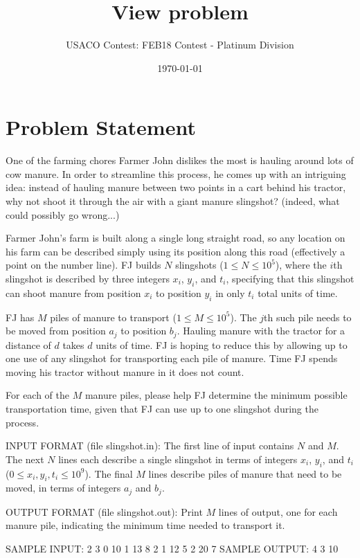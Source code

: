 \documentclass[12pt]{article}
\title{View problem}
\author{USACO Contest: FEB18 Contest - Platinum Division}
\date{\today}
\begin{document}
\maketitle

\section*{Problem Statement}

One of the farming chores Farmer John dislikes the most is hauling around lots
of cow manure.  In order to streamline this process, he comes up with an
intriguing idea: instead of hauling manure between two points in a cart behind
his tractor, why not shoot it through the air with a giant manure slingshot? 
(indeed, what could possibly go wrong...)

Farmer John's farm is built along a single long straight road, so any location
on his farm can be described simply using its position along this road
(effectively a point on the number line).  FJ builds $N$ slingshots
($1 \leq N \leq 10^5$), where the $i$th slingshot is described by three integers
$x_i$, $y_i$, and $t_i$, specifying that this slingshot can shoot manure from
position $x_i$ to position $y_i$ in only $t_i$ total units of time.  

FJ has $M$ piles of manure to transport ($1 \leq M \leq 10^5$).  The $j$th such
pile needs to be moved from position $a_j$ to position $b_j$.  Hauling manure
with the tractor for a distance of $d$ takes $d$ units of time.  FJ is hoping to
reduce this by allowing up to one use of any slingshot for transporting each
pile of manure.  Time FJ spends moving his tractor without manure in it does
not count.

For each of the $M$ manure piles, please help FJ determine the minimum possible
transportation time, given that FJ can use up to one slingshot during the
process.

INPUT FORMAT (file slingshot.in):
The first line of input contains $N$ and $M$.  The next $N$ lines each describe
a single slingshot in terms of integers $x_i$, $y_i$, and $t_i$
($0 \leq x_i, y_i, t_i \leq 10^9$). The final $M$ lines describe piles of manure
that need to be moved, in terms of integers $a_j$ and $b_j$.

OUTPUT FORMAT (file slingshot.out):
Print $M$ lines of output, one for each manure pile, indicating the minimum time
needed to transport it.

SAMPLE INPUT:
2 3
0 10 1
13 8 2
1 12
5 2
20 7
SAMPLE OUTPUT: 
4
3
10
\end{document}

